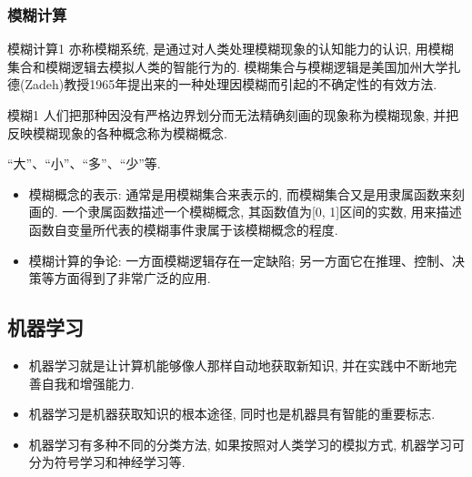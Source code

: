 \subsubsection{模糊计算}
\begin{mydef}{模糊计算}{1}
亦称模糊系统, 是通过对人类处理模糊现象的认知能力的认识, 用模糊集合和模糊逻辑去模拟人类的智能行为的. 模糊集合与模糊逻辑是美国加州大学扎德(Zadeh)教授1965年提出来的一种处理因模糊而引起的不确定性的有效方法.
\end{mydef}
\begin{mydef}{模糊}{1}
人们把那种因没有严格边界划分而无法精确刻画的现象称为模糊现象, 并把反映模糊现象的各种概念称为模糊概念.
\end{mydef}
\begin{example}
  “大”、“小”、“多”、“少”等.
\end{example}
\begin{itemize}
\item 模糊概念的表示: 通常是用模糊集合来表示的, 而模糊集合又是用隶属函数来刻画的. 一个隶属函数描述一个模糊概念, 其函数值为[0, 1]区间的实数, 用来描述函数自变量所代表的模糊事件隶属于该模糊概念的程度.
\item 模糊计算的争论: 一方面模糊逻辑存在一定缺陷; 另一方面它在推理、控制、决策等方面得到了非常广泛的应用.
\end{itemize}
\subsection{机器学习}
\begin{itemize}
\item 机器学习就是让计算机能够像人那样自动地获取新知识, 并在实践中不断地完善自我和增强能力.
\item 机器学习是机器获取知识的根本途径, 同时也是机器具有智能的重要标志.
\item 机器学习有多种不同的分类方法, 如果按照对人类学习的模拟方式, 机器学习可分为符号学习和神经学习等.
\end{itemize}
